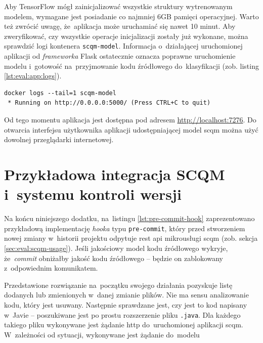 \documentclass[twoside]{praca}
\begin{document}
Aby TensorFlow mógł zainicjalizować wszystkie struktury wytrenowanym modelem, wymagane jest posiadanie co najmniej 6GB pamięci operacyjnej. Warto też zwrócić uwagę, że~aplikacja może uruchamiać się nawet 10 minut. Aby zweryfikować, czy wszystkie operacje inicjalizacji zostały już wykonane, można sprawdzić logi kontenera \texttt{scqm-model}. Informacja o~działającej uruchomionej aplikacji od \textit{frameworka} Flask ostatecznie oznacza poprawne uruchomienie modelu i~gotowość na~przyjmowanie kodu źródłowego do~klasyfikacji (zob. listing \ref{lst:eval:app:logs}).

\begin{lstlisting}[frame=single,caption={Logi kontenera scqm-model informujące o~poprawnym uruchomieniu aplikacji},captionpos=b,label={lst:eval:app:logs}]
docker logs --tail=1 scqm-model
 * Running on http://0.0.0.0:5000/ (Press CTRL+C to quit)
\end{lstlisting}

Od tego momentu aplikacja jest dostępna pod adresem \url{http://localhost:7276}. Do otwarcia interfejsu użytkownika aplikacji udostępniającej model \gls{scqm} można użyć dowolnej przeglądarki internetowej.

\clearpage
\section{Przykładowa integracja SCQM i~systemu kontroli wersji}
\label{apdx:git-hook}
\setcounter{table}{0}
\renewcommand{\thetable}{G.\arabic{table}}
\setcounter{figure}{0}
\renewcommand{\thefigure}{G.\arabic{figure}}
\setcounter{lstlisting}{0}
\renewcommand{\thelstlisting}{G.\arabic{lstlisting}}

Na końcu niniejszego dodatku, na~listingu \ref{lst:pre-commit-hook} zaprezentowano przykładową implementację \textit{hooka} typu \texttt{pre-commit}, który przed stworzeniem nowej zmiany w~historii projektu odpytuje \gls{rest} \gls{api} mikrousługi \gls{scqm} (zob. sekcja \ref{sec:eval:scqm-usage}). Jeśli jakościowy model kodu źródłowego wykryje, że~\textit{commit} obniżałby jakość kodu źródłowego -- będzie on zablokowany z~odpowiednim komunikatem.

Przedstawione rozwiązanie na~początku swojego działania pozyskuje listę dodanych lub zmienionych w~danej zmianie plików. Nie ma sensu analizowanie kodu, który jest usuwany. Następnie sprawdzane jest, czy jest to kod napisany w~Javie -- poszukiwane jest po prostu rozszerzenie pliku \texttt{.java}. Dla każdego takiego pliku wykonywane jest żądanie \gls{http} do~uruchomionej aplikacji \gls{scqm}. W~zależności od sytuacji, wykonywane jest żądanie do~modelu
\end{document}
